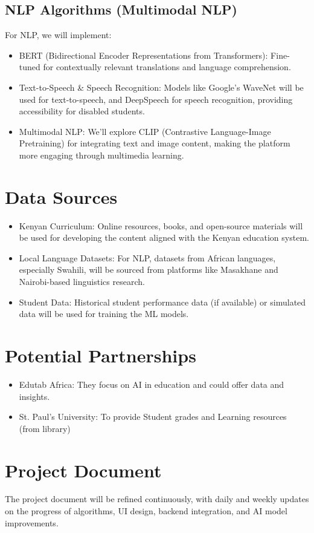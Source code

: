 \documentclass{article}
\begin{document}
\subsection{NLP Algorithms (Multimodal NLP)}
For NLP, we will implement:
\begin{itemize}
    \item BERT (Bidirectional Encoder Representations from Transformers): Fine-tuned for contextually relevant translations and language comprehension.
    \item Text-to-Speech \& Speech Recognition: Models like Google's WaveNet will be used for text-to-speech, and DeepSpeech for speech recognition, providing accessibility for disabled students.
    \item Multimodal NLP: We'll explore CLIP (Contrastive Language-Image Pretraining) for integrating text and image content, making the platform more engaging through multimedia learning.
\end{itemize}

\section{Data Sources}
\begin{itemize}
    \item Kenyan Curriculum: Online resources, books, and open-source materials will be used for developing the content aligned with the Kenyan education system.
    \item Local Language Datasets: For NLP, datasets from African languages, especially Swahili, will be sourced from platforms like Masakhane and Nairobi-based linguistics research.
    \item Student Data: Historical student performance data (if available) or simulated data will be used for training the ML models.
\end{itemize}

\section{Potential Partnerships}
\begin{itemize}
    \item Edutab Africa: They focus on AI in education and could offer data and insights.
    \item St. Paul's University: To provide Student grades and Learning resources (from library)
\end{itemize}

\section{Project Document}
The project document will be refined continuously, with daily and weekly updates on the progress of algorithms, UI design, backend integration, and AI model improvements.
\end{document}
